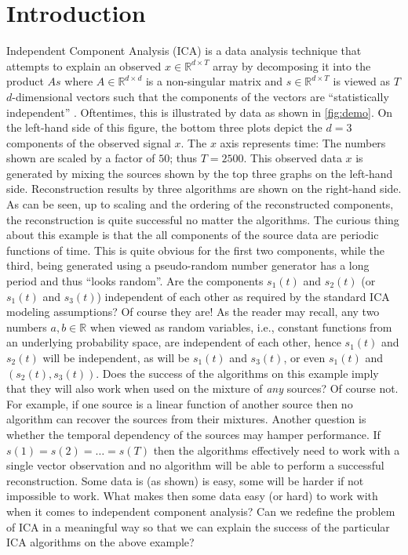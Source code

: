 \documentclass{article} %
\newcommand{\real}{\mathbb{R}}
\theoremstyle{definition}
\begin{document}
\section{Introduction}
Independent Component Analysis (ICA) is a data analysis technique that attempts to explain an observed $x\in \real^{d\times T}$ array by decomposing it into the product $A s$ where $A\in \real^{d\times d}$ is a non-singular matrix and $s\in \real^{d\times T}$ is viewed as $T$ $d$-dimensional vectors such that the components of the vectors are ``statistically independent'' \citep{HyKaOj01}.
Oftentimes, this is illustrated by data as shown in \cref{fig:demo}. 
On the left-hand side of this figure, the bottom three plots depict the $d=3$ components of the observed signal $x$. 
The $x$ axis represents time: The numbers shown are scaled by a factor of $50$; thus $T=2500$.
This observed data $x$ is generated by mixing the sources shown by the top three graphs on the left-hand side. 
Reconstruction results by three algorithms are shown on the right-hand side. As can be seen, 
up to scaling and the ordering of the reconstructed components, the reconstruction is quite successful no matter the algorithms.
The curious thing about this example is that the all components of the source data are periodic functions of time. This is quite obvious for the first two components, while the third, being generated using a pseudo-random number generator has a long period and thus ``looks random''.
Are the components $s_1(t)$ and $s_2(t)$ (or $s_1(t)$ and $s_3(t)$) independent of each other 
as required by the standard ICA modeling assumptions? Of course they are!
As the reader may recall,
any two numbers $a,b\in \real$ when viewed as random variables, i.e., constant functions from an underlying probability space,
are independent of each other, hence $s_1(t)$ and $s_2(t)$ will be independent, as will be $s_1(t)$ and $s_3(t)$, or 
even $s_1(t)$ and $(s_2(t),s_3(t))$.
Does the success of the algorithms on this example imply 
	that they will also work when used on the mixture of \emph{any} sources? 
Of course not. For example, if one source is a linear function of another source then no algorithm can recover the sources from their mixtures. Another question is whether the temporal dependency of the sources may hamper performance. If $s(1) = s(2) = \dots = s(T)$ then the algorithms effectively need to work with a single vector observation and no algorithm will be able to perform a successful reconstruction. Some data is (as shown) is easy, some will be harder if not impossible to work.
What makes then some data easy (or hard) to work with when it comes to independent component analysis?
Can we redefine the problem of ICA in a meaningful way so that we can explain the success of the particular ICA algorithms on the above example?
\end{document}
